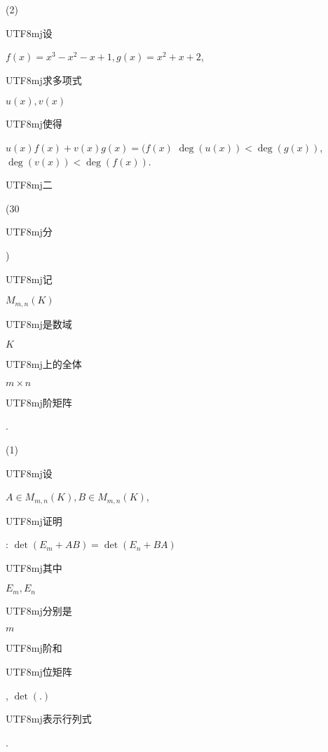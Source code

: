 \documentclass[10pt]{article}
\begin{document}
(2) \begin{CJK}{UTF8}{mj}设\end{CJK} $f(x)=x^{3}-x^{2}-x+1, g(x)=x^{2}+x+2$, \begin{CJK}{UTF8}{mj}求多项式\end{CJK} $u(x), v(x)$ \begin{CJK}{UTF8}{mj}使得\end{CJK} $u(x) f(x)+v(x) g(x)=(f(x)$ $\operatorname{deg}(u(x))<\operatorname{deg}(g(x))$, $\operatorname{deg}(v(x))<\operatorname{deg}(f(x))$.

\begin{CJK}{UTF8}{mj}二\end{CJK} (30 \begin{CJK}{UTF8}{mj}分\end{CJK}) \begin{CJK}{UTF8}{mj}记\end{CJK} $M_{m, n}(K)$ \begin{CJK}{UTF8}{mj}是数域\end{CJK} $K$ \begin{CJK}{UTF8}{mj}上的全体\end{CJK} $m \times n$ \begin{CJK}{UTF8}{mj}阶矩阵\end{CJK}.

(1) \begin{CJK}{UTF8}{mj}设\end{CJK} $A \in M_{m, n}(K), B \in M_{m, n}(K)$, \begin{CJK}{UTF8}{mj}证明\end{CJK}: $\operatorname{det}\left(E_{m}+A B\right)=\operatorname{det}\left(E_{n}+B A\right)$ \begin{CJK}{UTF8}{mj}其中\end{CJK} $E_{m}, E_{n}$ \begin{CJK}{UTF8}{mj}分别是\end{CJK} $m$ \begin{CJK}{UTF8}{mj}阶和\end{CJK} \begin{CJK}{UTF8}{mj}位矩阵\end{CJK}, $\operatorname{det}(.)$ \begin{CJK}{UTF8}{mj}表示行列式\end{CJK}.
\end{document}

